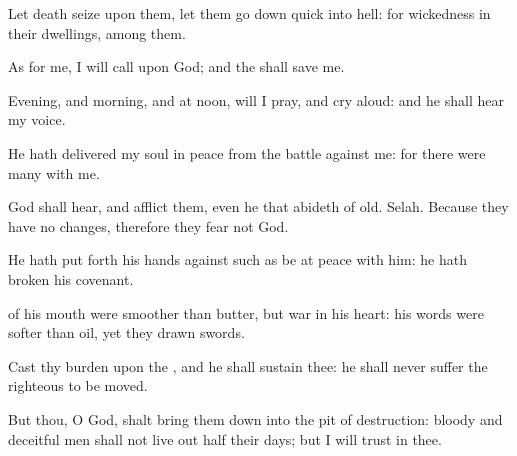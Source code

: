 {\par }{\Q {}Let
death
seize upon them,
{} let them go
down
quick into
hell: for
wickedness
{} in their
dwellings,
{}
among them.
\par }{\BB \par }{\Q {}As for me, I will
call upon
God; and the
{} shall
save me.
\par }{\Q {}Evening, and
morning, and at
noon, will I
pray, and cry
aloud: and he shall
hear my
voice.
\par }{\Q {}He hath
delivered my
soul in
peace from the
battle
{} against me: for there were
many with me.
\par }{\Q {}God shall
hear, and
afflict them, even he that
abideth of
old.
Selah. Because they have no
changes, therefore they
fear not
God.
\par }{\Q {}He hath put
forth his
hands against such as be at
peace with him: he hath
broken his
covenant.
\par }{\Q {} of his
mouth were
smoother than
butter, but
war
{} in his
heart: his
words were
softer than
oil, yet
{} they drawn
swords.
\par }{\Q {}Cast thy
burden upon the
{}, and he shall
sustain thee: he shall
never
suffer the
righteous to be
moved.
\par }{\Q {}But thou, O
God, shalt bring them
down into the
pit of
destruction:
bloody and
deceitful
men shall not live out
half their
days; but I will
trust in thee.

}
